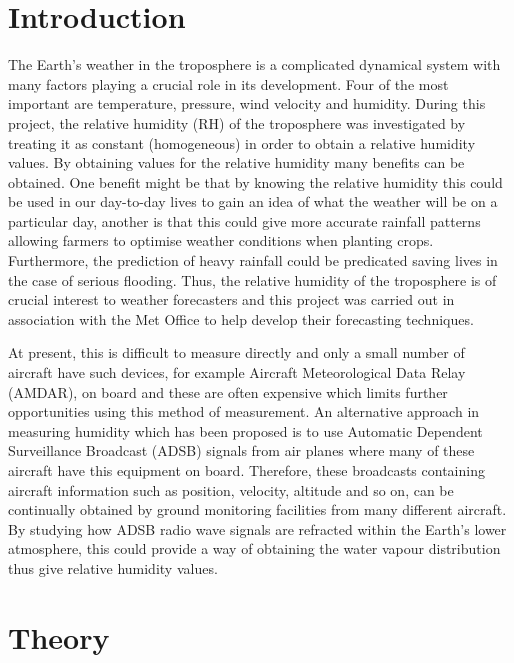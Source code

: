 \documentclass{article}
\begin{document}
\tableofcontents
\setcounter{page}{1} %

\newpage

\section{Introduction}
\label{sec:introduction}

The Earth's weather in the troposphere is a complicated dynamical system with many factors playing a crucial role in its development. Four of the most important are temperature, pressure, wind velocity and humidity. During this project, the relative humidity (RH) of the troposphere was investigated by treating it as constant (homogeneous) in order to obtain a relative humidity values. By obtaining values for the relative humidity many benefits can be obtained. One benefit might be that by knowing the relative humidity this could be used in our day-to-day lives to gain an idea of what the weather will be on a particular day, another is that this could give more accurate rainfall patterns allowing farmers to optimise weather conditions when planting crops. Furthermore, the prediction of heavy rainfall could be predicated {\textemdash} saving lives in the case of serious flooding. Thus, the relative humidity of the troposphere is of crucial interest to weather forecasters and this project was carried out in association with the Met Office to help develop their forecasting techniques.

\vspace{2mm}
\noindent
At present, this is difficult to measure directly and only a small number of aircraft have such devices, for example Aircraft Meteorological Data Relay (AMDAR), on board \cite{Paper01} and these are often expensive which limits further opportunities using this method of measurement. An alternative approach in measuring humidity which has been proposed \cite{Paper01} is to use Automatic Dependent Surveillance Broadcast (ADSB) signals from air planes where many of these aircraft have this equipment on board. Therefore, these broadcasts containing aircraft information such as position, velocity, altitude and so on, can be continually obtained by ground monitoring facilities from many different aircraft. By studying how ADSB radio wave signals are refracted within the Earth's lower atmosphere, this could provide a way of obtaining the water vapour distribution thus give relative humidity values.


\section{Theory}
\label{sec:theory}
\end{document}
